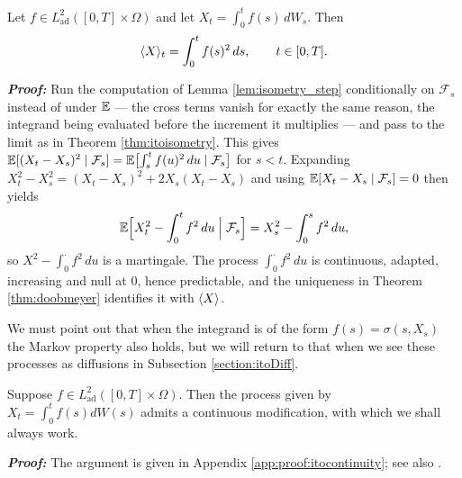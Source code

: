 \begin{corollary}\label{cor:qvitointegral}
Let $f \in L^2_{\mathrm{ad}}([0,T]\times\Omega)$ and let $X_t = \int_0^t f(s)\,dW_s$. Then
\begin{equation}\label{eq:qvitointegral}
\langle X \rangle_t = \int_0^t f(s)^2\,ds, \qquad t \in [0,T].
\end{equation}
\end{corollary}

\textbf{\textit{Proof:}} Run the computation of Lemma \ref{lem:isometry_step} conditionally on
$\mathcal{F}_s$ instead of under $\mathbb{E}$ --- the cross terms vanish for exactly the same reason, the
integrand being evaluated before the increment it multiplies --- and pass to the limit as in Theorem
\ref{thm:itoisometry}. This gives
$\mathbb{E}[(X_t-X_s)^2\mid\mathcal{F}_s] = \mathbb{E}\bigl[\int_s^t f(u)^2\,du \mid \mathcal{F}_s\bigr]$ for
$s<t$. Expanding $X_t^2 - X_s^2 = (X_t-X_s)^2 + 2X_s(X_t-X_s)$ and using
$\mathbb{E}[X_t - X_s\mid\mathcal{F}_s]=0$ then yields
\[
\mathbb{E}\Bigl[X_t^2 - \int_0^t f^2\,du \;\Big|\; \mathcal{F}_s\Bigr] = X_s^2 - \int_0^s f^2\,du ,
\]
so $X^2 - \int_0^\cdot f^2\,du$ is a martingale. The process $\int_0^\cdot f^2\,du$ is continuous,
adapted, increasing and null at $0$, hence predictable, and the uniqueness in Theorem
\ref{thm:doobmeyer} identifies it with $\langle X \rangle$. \qedfilledtext

\medskip

We must point out that when the integrand is of the form $f(s) = \sigma(s,X_s)$ the Markov property also holds, but we will return to that when we see these processes as diffusions in Subsection \ref{section:itoDiff}. 



\begin{theorem}\label{thm:itocontinuity}
    Suppose $f\in L^2_{\mathrm{ad}}([0,T]\times\Omega). $ Then the process given by $X_t = \int_0^t f(s)dW(s)$ admits a continuous modification, with which we shall always work.
\end{theorem}
\textbf{\textit{Proof:}} The argument is given in Appendix \ref{app:proof:itocontinuity}; see also \cite[Thm.\ 4.6.2]{kuo2006}. \qedfilledtext

